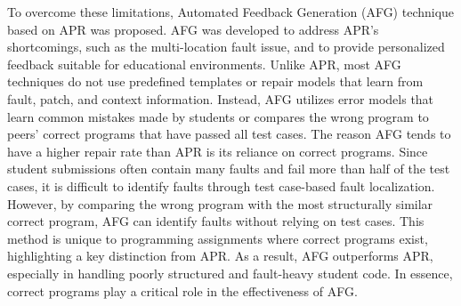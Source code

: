 \documentclass[10pt,conference]{IEEEtran}
\begin{document}
    To overcome these limitations, Automated Feedback Generation (AFG) technique based on APR was proposed. AFG was developed to address APR's shortcomings, such as the multi-location fault issue, and to provide personalized feedback suitable for educational environments. Unlike APR, most AFG techniques\cite{hu2019re, wang2018search, gulwani2018automated, li2022generating, pu2016sk_p, heo2023referent,singh2013automated,mechtaev2018semantic,ahmed2022verifix,d2016qlose,choi2021automated,song2021context,rolim2017learning,kaleeswaran2016semi} do not use predefined templates\cite{liu2019tbar} or repair models\cite{li2022transrepair} that learn from fault, patch, and context information. Instead, AFG utilizes error models\cite{singh2013automated} that learn common mistakes made by students or compares the wrong program to peers' correct programs that have passed all test cases. The reason AFG tends to have a higher repair rate than APR is its reliance on correct programs. Since student submissions often contain many faults and fail more than half of the test cases, it is difficult to identify faults through test case-based fault localization\cite{yi2017feasibility}. However, by comparing the wrong program with the most structurally similar correct program, AFG can identify faults without relying on test cases. This method is unique to programming assignments where correct programs exist, highlighting a key distinction from APR. As a result, AFG outperforms APR, especially in handling poorly structured and fault-heavy student code. In essence, correct programs play a critical role in the effectiveness of AFG.
\end{document}
